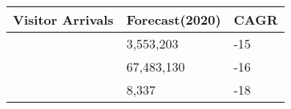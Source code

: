 \begin{tabular}[t]{|p{4cm}|p{2cm}|p{1.25cm}|}
  \hline
Visitor Arrivals & Forecast(2020) & CAGR \\ 
  \hline
 &  3,553,203 & -15 \\ 
   & 67,483,130 & -16 \\ 
   &      8,337 & -18 \\ 
   \hline
\end{tabular}
